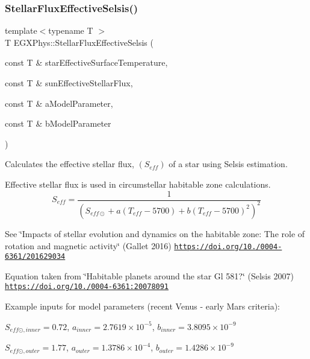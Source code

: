 \subsubsection{\texorpdfstring{Stellar\+Flux\+Effective\+Selsis()}{StellarFluxEffectiveSelsis()}}
{\footnotesize\ttfamily template$<$typename T $>$ \\
T E\+G\+X\+Phys\+::\+Stellar\+Flux\+Effective\+Selsis (\begin{DoxyParamCaption}\item[{const T \&}]{star\+Effective\+Surface\+Temperature,  }\item[{const T \&}]{sun\+Effective\+Stellar\+Flux,  }\item[{const T \&}]{a\+Model\+Parameter,  }\item[{const T \&}]{b\+Model\+Parameter }\end{DoxyParamCaption})}



Calculates the effective stellar flux, $(S_{eff})$ of a star using Selsis estimation. 

Effective stellar flux is used in circumstellar habitable zone calculations. \[S_{eff}= \frac{1}{(S_{eff\odot}+a(T_{eff}-5700)+b(T_{eff}-5700)^2)^2}\]

See \char`\"{}\+Impacts of stellar evolution and dynamics on the habitable zone\+: The role of rotation and magnetic activity\char`\"{} (Gallet 2016) \href{https://doi.org/10.1051/0004-6361/201629034}{\tt https\+://doi.\+org/10./0004-\/6361/201629034}

Equation taken from \char`\"{}\+Habitable planets around the star Gl 581?\char`\"{} (Selsis 2007) \href{https://doi.org/10.1051/0004-6361:20078091}{\tt https\+://doi.\+org/10./0004-\/6361\+:20078091}

Example inputs for model parameters (recent Venus -\/ early Mars criteria)\+:

$S_{eff\odot,inner} = 0.72$, $a_{inner} = 2.7619 \times 10^{-5}$, $b_{inner} = 3.8095 \times 10^{-9}$

$S_{eff\odot,outer} = 1.77$, $a_{outer} = 1.3786 \times 10^{-4}$, $b_{outer} = 1.4286 \times 10^{-9}$


